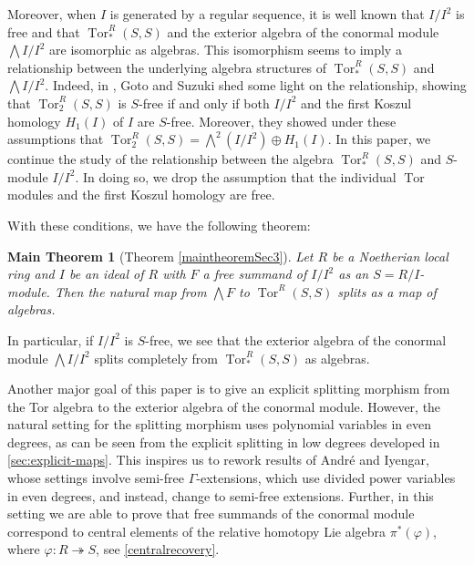 \documentclass{amsart}
\newtheorem*{main*}{Main Theorem}
\theoremstyle{definition}
\theoremstyle{remark}
\newcommand{\Tor}{\ensuremath{\operatorname{Tor}}}
\begin{document}
Moreover, when $I$ is generated by a regular sequence, it is well known that $I/I^2$ is free and that  $\Tor^{R}_{*}(S,S)$ and  the exterior algebra of the conormal module $\bigwedge I/I^2$ are isomorphic as algebras. This isomorphism seems to imply a relationship between the underlying algebra structures of $\Tor^{R}_*(S,S)$  and $\bigwedge I/I^2$. Indeed, in \cite{GotoSuzuki}, Goto and Suzuki shed some light on the relationship, showing that $\Tor^R_2(S,S)$ is $S$-free if and only if both $I/I^2$ and the first Koszul homology $H_1(I)$ of $I$ are $S$-free. Moreover, they showed under these assumptions that $\Tor^R_2(S,S) = \bigwedge^2 (I/I^2) \oplus H_1(I)$. In this paper, we continue the study of the relationship between the algebra $\Tor_{*}^{R}(S,S)$ and $S$-module $I/I^2$. In doing so, we drop the assumption that the individual $\Tor$ modules and the first Koszul homology are free. 
 
 With these conditions, we have the following theorem:


\begin{main*}[Theorem \ref{maintheoremSec3}] 
    Let $R$ be a Noetherian local ring and $I$ be an ideal of $R$ with $F$  a free summand of $I/I^2$ as an $S= R/I$-module. Then the natural map from $\bigwedge F$ to $\Tor^{R}(S,S)$ splits as a map of algebras. 
\end{main*}

In particular, if $I/I^2$ is $S$-free, we see that the exterior algebra of the conormal module $\bigwedge I/I^2$ splits completely from $\Tor_{*}^{R}(S,S)$ as algebras. 

Another major goal of this paper is to give an explicit splitting morphism from the Tor algebra to the exterior algebra of the conormal module. However, the natural setting for the splitting morphism uses polynomial variables in even degrees, as can be seen from the explicit splitting in low degrees developed in \cref{sec:explicit-maps}. This inspires us to rework results of André and Iyengar, whose settings involve semi-free $\Gamma$-extensions, which use divided power variables in even degrees, and instead, change to semi-free extensions. Further, in this setting we are able to prove that free summands of the conormal module correspond to central elements of the relative homotopy Lie algebra $\pi^*(\varphi)$, where $\varphi: R \twoheadrightarrow S$, see \cref{centralrecovery}.
\end{document}
